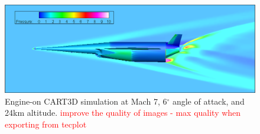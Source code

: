		
		\begin{figure}[ht]
			\centering
			\includegraphics[width=0.9\linewidth]{figures/3_vehicle_design/EngineOn-M7AoA024km}
			\caption{Engine-on CART3D simulation at Mach 7, 6$^\circ$ angle of attack, and 24km altitude. \textcolor{red}{improve the quality of images - max quality when exporting from tecplot}}
			\label{fig:EngineOn-M7AoA624km}
		\end{figure}
		
